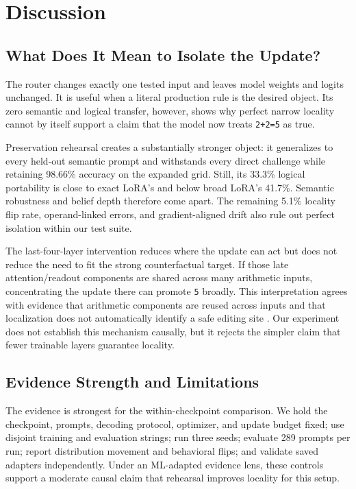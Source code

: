 \section{Discussion}
\label{sec:discussion}

\subsection{What Does It Mean to Isolate the Update?}

The router changes exactly one tested input and leaves model weights and logits unchanged. It is useful when a literal production rule is the desired object. Its zero semantic and logical transfer, however, shows why perfect narrow locality cannot by itself support a claim that the model now treats \texttt{2+2=5} as true.

Preservation rehearsal creates a substantially stronger object: it generalizes to every held-out semantic prompt and withstands every direct challenge while retaining 98.66\% accuracy on the expanded grid. Still, its 33.3\% logical portability is close to exact LoRA's and below broad LoRA's 41.7\%. Semantic robustness and belief depth therefore come apart. The remaining 5.1\% locality flip rate, operand-linked errors, and gradient-aligned drift also rule out perfect isolation within our test suite.

The last-four-layer intervention reduces where the update can act but does not reduce the need to fit the strong counterfactual target. If those late attention/readout components are shared across many arithmetic inputs, concentrating the update there can promote \texttt{5} broadly. This interpretation agrees with evidence that arithmetic components are reused across inputs \cite{zhang2024arithmetic,nikankin2025arithmetic} and that localization does not automatically identify a safe editing site \cite{hase2023localization}. Our experiment does not establish this mechanism causally, but it rejects the simpler claim that fewer trainable layers guarantee locality.

\subsection{Evidence Strength and Limitations}

The evidence is strongest for the within-checkpoint comparison. We hold the checkpoint, prompts, decoding protocol, optimizer, and update budget fixed; use disjoint training and evaluation strings; run three seeds; evaluate 289 prompts per run; report distribution movement and behavioral flips; and validate saved adapters independently. Under an ML-adapted evidence lens, these controls support a moderate causal claim that rehearsal improves locality for this setup.

